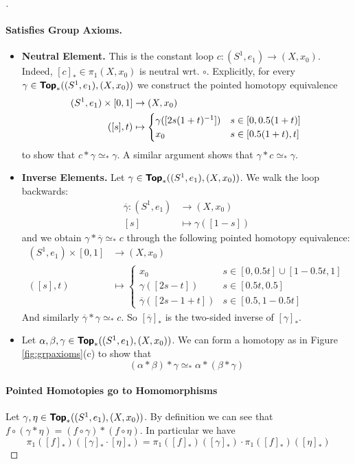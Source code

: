 \begin{proof}[]
  \paragraph{Satisfies Group Axioms.} \begin{itemize}
    \item \textbf{Neutral Element.} This is the constant loop $c:(S^1,e_1)\to(X,x_0)$. Indeed, $[c]_*\in \pi_1(X,x_0)$ is neutral wrt. $\circ$. Explicitly, for every $\gamma\in\bm{\mathsf{Top}}_*((S^1,e_1),(X,x_0))$ we construct the pointed homotopy equivalence \begin{align*}
      (S^1,e_1)\times[0,1] &\to (X,x_0) \\
      ([s],t) &\mapsto \begin{cases}
        \gamma([2s(1+t)^{-1}]) & s\in[0,0.5(1+t)] \\
        x_0 & s\in[0.5(1+t),t]
      \end{cases}
    \end{align*}
    to show that $c\ast \gamma\simeq_* \gamma$. A similar argument shows that $\gamma\ast c\simeq_* \gamma$.
    \item \textbf{Inverse Elements.} Let $\gamma\in\bm{\mathsf{Top}}_*((S^1,e_1),(X,x_0))$. We walk the loop backwards: \begin{align*}
      \overline{\gamma} : (S^1,e_1) &\to (X,x_0) \\
      [s] &\mapsto \gamma([1-s])
    \end{align*}
    and we obtain $\gamma\ast\overline{\gamma}\simeq_*c$ through the following pointed homotopy equivalence: \begin{align*}
      (S^1,e_1)\times[0,1] &\to (X,x_0)\\
      ([s],t)&\mapsto \begin{cases}
        x_0 & s\in[0,0.5t]\cup[1-0.5t,1]\\
        \gamma([2s-t]) & s\in[0.5t,0.5]\\
        \overline{\gamma}([2s-1+t]) & s\in[0.5,1-0.5t]
      \end{cases}
    \end{align*}
    And similarly $\overline{\gamma}\ast\gamma\simeq_* c$. So $[\overline{\gamma}]_*$ is the two-sided inverse of $[\gamma]_*$.
    \item Let $\alpha,\beta,\gamma\in\bm{\mathsf{Top}}_*((S^1,e_1),(X,x_0))$. We can form a homotopy as in Figure \ref{fig:grpaxioms}(c) to show that \[(\alpha\ast\beta)\ast\gamma \simeq_* \alpha\ast(\beta\ast\gamma)\]
  \end{itemize}

  \paragraph{Pointed Homotopies go to Homomorphisms} Let $\gamma,\eta\in\bm{\mathsf{Top}}_*((S^1,e_1),(X,x_0))$. By definition we can see that $f\circ(\gamma\ast\eta)=(f\circ\gamma)\ast(f\circ\eta)$. In particular we have \[
    \pi_1([f]_*)([\gamma]_* \cdot [\eta]_*) =  \pi_1([f]_*)([\gamma]_*) \cdot  \pi_1([f]_*)([\eta]_*)
  \]
\end{proof}

